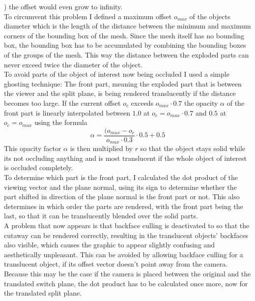 ) the offset would even grow to infinity.\\
To circumvent this problem I defined a maximum offset $o_{max}$ of the objects diameter which is the length of the distance between the minimum and maximum corners of the bounding box of the mesh. Since the mesh itself has no bounding box, the bounding box has to be accumulated by combining the bounding boxes of the groups of the mesh. This way the distance between the exploded parts can never exceed twice the diameter of the object.\\
To avoid parts of the object of interest now being occluded I used a simple ghosting technique: 
The front part, meaning the exploded part that is between the viewer and the split plane, is being rendered translucently if the distance becomes too large.
If the current offset $o_c$ exceeds $o_{max} \cdot 0.7$ the opacity $\alpha$ of the front part is linearly interpolated between $1.0$ at $o_c = o_{max} \cdot 0.7$ and $0.5$ at  $o_c = o_{max}$ using the formula
\begin{equation}
	\alpha = \frac{( o_{max}-o_c}{o_{max} \cdot 0.3} \cdot 0.5 + 0.5
\end{equation}
This opacity factor $\alpha$ is then multiplied by $r$ so that the object stays solid while its not occluding anything and is most translucent if the whole object of interest is occluded completely.\\
To determine which part is the front part, I calculated the dot product of the viewing vector and the plane normal, using its sign to determine whether the part shifted in direction of the plane normal is the front part or not. This also determines in which order the parts are rendered, with the front part being the last, so that it can be translucently blended over the solid parts.\\
A problem that now appears is that backface culling is deactivated to so that the cutaway can be rendered correctly, resulting in the translucent objects' backfaces also visible, which causes the graphic to appear slightly confusing and aesthetically unpleasant. This can be avoided by allowing backface culling for a translucent object, if its offset vector doesn't point away from the camera. Because this may be the case if the camera is placed between the original and the translated switch plane, the dot product has to be calculated once more, now for the translated split plane.\\

